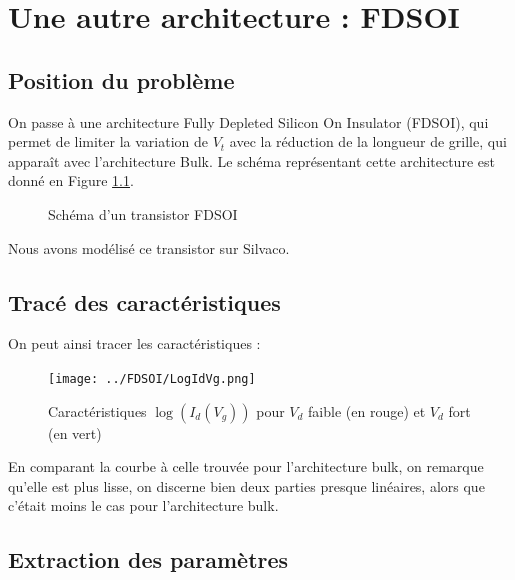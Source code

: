 \documentclass[a4paper,11pt]{report}
\begin{document}
\chapter{Une autre architecture : FDSOI}

\section{Position du problème}

On passe à une architecture Fully Depleted Silicon On Insulator (FDSOI), qui permet de limiter la variation de $V_t$ avec la réduction de la longueur de grille, qui apparaît avec l'architecture Bulk.  Le schéma représentant cette architecture est donné en Figure \ref{SchemaFDSOI}.

\begin{figure}[H]
    \centering
    \caption{Schéma d'un transistor FDSOI}
    \label{SchemaFDSOI}
\end{figure}

Nous avons modélisé ce transistor sur Silvaco.

\section{Tracé des caractéristiques}

On peut ainsi tracer les caractéristiques :

\begin{figure}[H]
    \centering
    \texttt{[image: ../FDSOI/LogIdVg.png]}
    \caption{Caractéristiques $\log(I_d(V_g))$ pour $V_d$ faible (en rouge) et $V_d$ fort (en vert)}    
\end{figure}

En comparant la courbe à celle trouvée pour l'architecture bulk, on remarque qu'elle est plus lisse, on discerne bien deux parties presque linéaires, alors que c'était moins le cas pour l'architecture bulk.

\section{Extraction des paramètres}
\end{document}
